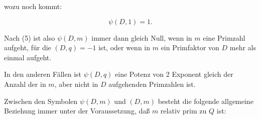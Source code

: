 wozu noch kommt:

\[ \psi(D,1)=1. \]

Nach (5) ist also $\psi(D,m)$ immer dann gleich Null, wenn in
$m$ eine Primzahl aufgeht, für die $(D,q)=-1$ ist, oder wenn
in $m$ ein Primfaktor von $D$ mehr als einmal aufgeht.

In den anderen Fällen ist $\psi(D,q)$ eine Potenz von 2 %
Exponent gleich der Anzahl der in $m$, aber nicht in $D$ aufgehenden
 Primzahlen ist.

Zwischen den Symbolen $\psi(D,m)$ und $(D,m)$ besteht die
folgende allgemeine Beziehung immer unter der Voraussetzung,
daß $m$ relativ prim zu $Q$ ist:
